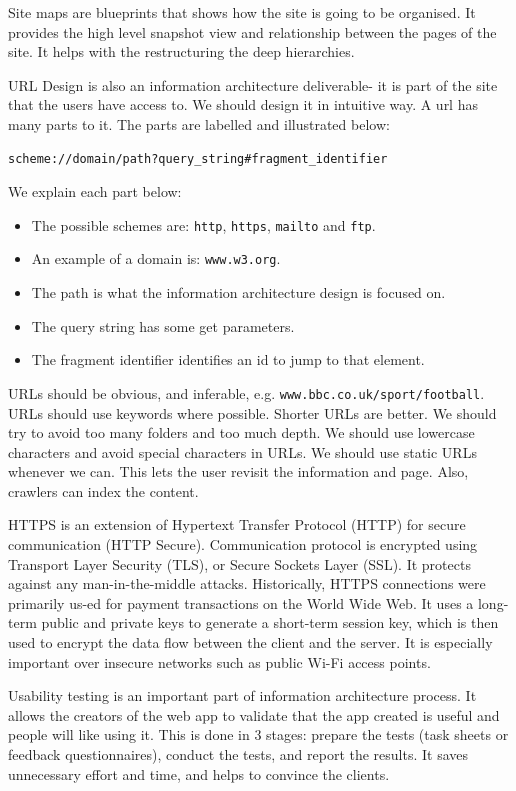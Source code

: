 \documentclass[a4paper, openany]{memoir}
\begin{document}
\noindent Site maps are blueprints that shows how the site is going to be organised. It provides the high level snapshot view and relationship between the pages of the site. It helps with the restructuring the deep hierarchies.

\noindent URL Design is also an information architecture deliverable- it is part of the site that the users have access to. We should design it in intuitive way. A url has many parts to it. The parts are labelled and illustrated below:
\begin{verbatim}
scheme://domain/path?query_string#fragment_identifier
\end{verbatim}
We explain each part below:
\begin{itemize}
    \item The possible schemes are: \texttt{http}, \texttt{https}, \texttt{mailto} and \texttt{ftp}.
    \item An example of a domain is: \texttt{www.w3.org}.
    \item The path is what the information architecture design is focused on.
    \item The query string has some get parameters.
    \item The fragment identifier identifies an id to jump to that element.
\end{itemize}
URLs should be obvious, and inferable, e.g. \texttt{www.bbc.co.uk/sport/football}. URLs should use keywords where possible. Shorter URLs are better. We should try to avoid too many folders and too much depth. We should use lowercase characters and avoid special characters in URLs. We should use static URLs whenever we can. This lets the user revisit the information and page. Also, crawlers can index the content.

\noindent HTTPS is an extension of Hypertext Transfer Protocol (HTTP) for secure communication (HTTP Secure). Communication protocol is encrypted using Transport Layer Security (TLS), or Secure Sockets Layer (SSL). It protects against any man-in-the-middle attacks. Historically, HTTPS connections were primarily us-ed for payment transactions on the World Wide Web. It uses a long-term public and private keys to generate a short-term session key, which is then used to encrypt the data flow between the client and the server. It is especially important over insecure networks such as public Wi-Fi access points.

\noindent Usability testing is an important part of information architecture process. It allows the creators of the web app to validate that the app created is useful and people will like using it. This is done in 3 stages: prepare the tests (task sheets or feedback questionnaires), conduct the tests, and report the results. It saves unnecessary effort and time, and helps to convince the clients.
\end{document}
